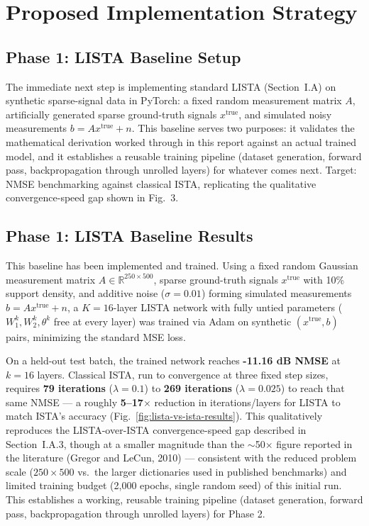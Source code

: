\documentclass[conference]{IEEEtran}
\begin{document}
\section{Proposed Implementation Strategy}

\subsection{Phase 1: LISTA Baseline Setup}
The immediate next step is implementing standard LISTA (Section~I.A) on synthetic sparse-signal data in PyTorch: a fixed random measurement matrix $A$, artificially generated sparse ground-truth signals $x^{\text{true}}$, and simulated noisy measurements $b = Ax^{\text{true}} + n$. This baseline serves two purposes: it validates the mathematical derivation worked through in this report against an actual trained model, and it establishes a reusable training pipeline (dataset generation, forward pass, backpropagation through unrolled layers) for whatever comes next. Target: NMSE benchmarking against classical ISTA, replicating the qualitative convergence-speed gap shown in Fig.~3.

\subsection{Phase 1: LISTA Baseline Results}
This baseline has been implemented and trained. Using a fixed random Gaussian measurement matrix $A \in \mathbb{R}^{250 \times 500}$, sparse ground-truth signals $x^{\text{true}}$ with 10\% support density, and additive noise ($\sigma = 0.01$) forming simulated measurements $b = Ax^{\text{true}} + n$, a $K=16$-layer LISTA network with fully untied parameters ($W_1^k, W_2^k, \theta^k$ free at every layer) was trained via Adam on synthetic $(x^{\text{true}}, b)$ pairs, minimizing the standard MSE loss.

On a held-out test batch, the trained network reaches \textbf{-11.16 dB NMSE} at $k=16$ layers. Classical ISTA, run to convergence at three fixed step sizes, requires \textbf{79 iterations} ($\lambda = 0.1$) to \textbf{269 iterations} ($\lambda = 0.025$) to reach that same NMSE — a roughly \textbf{5--17$\times$} reduction in iterations/layers for LISTA to match ISTA's accuracy (Fig.~\ref{fig:lista-vs-ista-results}). This qualitatively reproduces the LISTA-over-ISTA convergence-speed gap described in Section~I.A.3, though at a smaller magnitude than the $\sim$50$\times$ figure reported in the literature (Gregor and LeCun, 2010) — consistent with the reduced problem scale ($250\times500$ vs.\ the larger dictionaries used in published benchmarks) and limited training budget (2{,}000 epochs, single random seed) of this initial run. This establishes a working, reusable training pipeline (dataset generation, forward pass, backpropagation through unrolled layers) for Phase 2.
\end{document}
